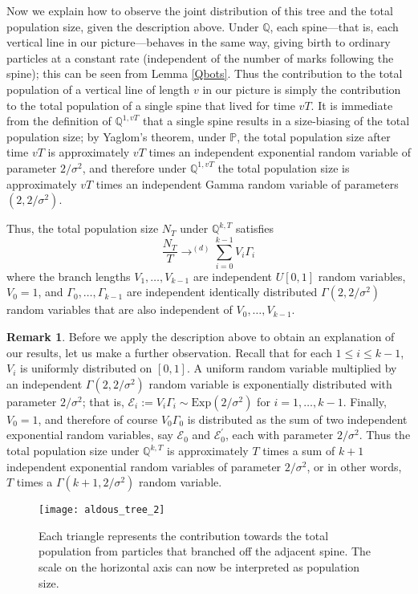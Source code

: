 \documentclass{article}
\theoremstyle{plain}
\theoremstyle{definition}
\newtheorem*{rmk}{Remark}
\newcommand{\Q}{\mathbb{Q}}
\renewcommand{\P}{\mathbb{P}}
\begin{document}
Now we explain how to observe the joint distribution of this tree and the total population size, given the description above. Under $\Q$, each spine---that is, each vertical line in our picture---behaves in the same way, giving birth to ordinary particles at a constant rate (independent of the number of marks following the spine); this can be seen from Lemma \ref{Qbots}. Thus the contribution to the total population of a vertical line of length $v$ in our picture is simply the contribution to the total population of a single spine that lived for time $vT$. It is immediate from the definition of $\Q^{1,vT}$ that a single spine results in a size-biasing of the total population size; by Yaglom's theorem, under $\P$, the total population size after time $vT$ is approximately $vT$ times an independent exponential random variable of parameter $2/\sigma^2$, and therefore under $\Q^{1,vT}$ the total population size is approximately $vT$ times an independent Gamma random variable of parameters $(2,2/\sigma^2)$.



Thus, the total population size $N_T$ under $\Q^{k,T}$ satisfies
\[\frac{N_T}{T} \to^{(d)} \sum_{i=0}^{k-1} V_i \Gamma_i\]
where the branch lengths $V_{1},\dots,V_{k-1}$ are independent $U[0,1]$ random variables, $V_0=1$, and $\Gamma_0,\dots,\Gamma_{k-1}$ are independent identically distributed $\Gamma(2,2/\sigma^2)$ random variables that are also independent of $V_0,\ldots,V_{k-1}$.



\begin{rmk}
Before we apply the description above to obtain an explanation of our results, let us make a further observation. Recall that for each $1\le i \le k-1$, $V_i$ is uniformly distributed on $[0,1]$. A uniform random variable multiplied by an independent $\Gamma(2,2/\sigma^2)$ random variable is exponentially distributed with parameter $2/\sigma^2$; that is, $\mathcal E_i:=V_i\Gamma_i\sim\mathrm{Exp}(2/\sigma^2)$ for $i=1,\dots,k-1$.
Finally, $V_0=1$, and therefore of course $V_0 \Gamma_0$ is distributed as the sum of two independent exponential random variables, say $\mathcal E_0$ and $\mathcal E_0^\prime$, each with parameter $2/\sigma^2$. Thus the total population size under $\Q^{k,T}$ is approximately $T$ times a sum of $k+1$ independent exponential random variables of parameter $2/\sigma^2$, or in other words, $T$ times a $\Gamma(k+1,2/\sigma^2)$ random variable. 
\end{rmk}

\begin{figure}[h!]
  \centering
      \texttt{[image: aldous\_tree\_2]}
   \vspace{0mm}
  \caption{\small{Each triangle represents the contribution towards the total population from particles that branched off the adjacent spine. The scale on the horizontal axis can now be interpreted as population size.}}
  \label{Qpopconst}
  \end{figure}
\end{document}
